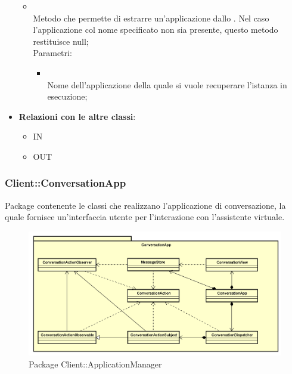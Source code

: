 \begin{itemize}
\begin{itemize}
		\item[]  \\		Metodo che permette di estrarre un'applicazione dallo . Nel caso l'applicazione col nome specificato non sia presente, questo metodo restituisce null;\\
		Parametri:
		\begin{itemize}
			\item {} \\
			Nome dell'applicazione della quale si vuole recuperare l'istanza in esecuzione;
		\end{itemize}
	\end{itemize}
	\item \textbf{Relazioni con le altre classi}:
	\begin{itemize}
		\item IN \hyperlink{Manager_label}{}
		\item OUT \hyperlink{Application_label}{}
	\end{itemize}
\end{itemize}
\FloatBarrier

\subsubsection{Client::ConversationApp}
Package contenente le classi che realizzano l'applicazione di conversazione, la quale fornisce un'interfaccia utente per l'interazione con l'assistente virtuale.
\begin{figure}[h] \centering \includegraphics[width=\textwidth,height=\textheight,keepaspectratio]{images/diagrams/client/Client/ConversationApp.png}
	\caption{Package Client::ApplicationManager}
\end{figure}
\newpage


